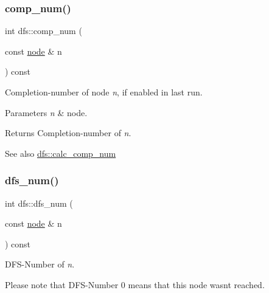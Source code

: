 \mbox{\label{classdfs_aceb066c806cb0beb5688b167a17387c7}} 
\subsubsection{\texorpdfstring{comp\+\_\+num()}{comp\_num()}}
{\footnotesize\ttfamily int dfs\+::comp\+\_\+num (\begin{DoxyParamCaption}\item[{const \mbox{\hyperlink{classnode}{node}} \&}]{n }\end{DoxyParamCaption}) const\hspace{0.3cm}{\ttfamily [inline]}}



Completion-\/number of node {\itshape n}, if enabled in last run. 


\begin{DoxyParams}{Parameters}
{\em n} & node. \\
\hline
\end{DoxyParams}
\begin{DoxyReturn}{Returns}
Completion-\/number of {\itshape n}. 
\end{DoxyReturn}
\begin{DoxySeeAlso}{See also}
\mbox{\hyperlink{classdfs_a70862ea715c52eb95fb704afd3a6e676}{dfs\+::calc\+\_\+comp\+\_\+num}} 
\end{DoxySeeAlso}
\mbox{\label{classdfs_a315f16831a0bd333960e87e045cb37c8}} 
\subsubsection{\texorpdfstring{dfs\+\_\+num()}{dfs\_num()}}
{\footnotesize\ttfamily int dfs\+::dfs\+\_\+num (\begin{DoxyParamCaption}\item[{const \mbox{\hyperlink{classnode}{node}} \&}]{n }\end{DoxyParamCaption}) const\hspace{0.3cm}{\ttfamily [inline]}}



D\+F\+S-\/\+Number of {\itshape n}. 

Please note that D\+F\+S-\/\+Number 0 means that this node wasn\textquotesingle{}t reached.


